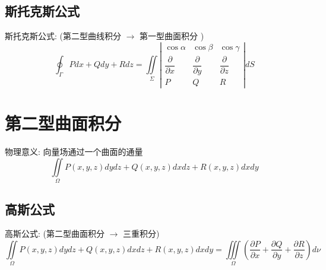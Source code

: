\subsection{斯托克斯公式}
\begin{theorem}[斯托克斯公式]
	斯托克斯公式: (第二型曲线积分 $\rightarrow$ 第一型曲面积分 )
	$$\oint_{\Gamma}Pdx+Qdy+Rdz=\iint\limits_{\Sigma}\left| \begin{array}{lll}
		\cos\alpha&\cos\beta&\cos\gamma\\
		\dfrac{\partial}{\partial x}&\dfrac{\partial }{\partial y}&\dfrac{\partial}{\partial z}\\
		P&Q&R
	\end{array}\right|dS $$
\end{theorem}
\section{第二型曲面积分}
\begin{definition}[第二型曲面积分]
	物理意义: 向量场通过一个曲面的通量
	$$\iint\limits_{\Omega}P(x,y,z)dydz+Q(x,y,z)dxdz+R(x,y,z)dxdy$$
\end{definition}
\subsection{高斯公式}
\begin{theorem}[高斯公式]
	高斯公式: (第二型曲面积分 $\rightarrow$ 三重积分)
	$$\iint\limits_{\Omega}P(x,y,z)dydz+Q(x,y,z)dxdz+R(x,y,z)dxdy=\iiint\limits_{\Omega}(\frac{\partial P}{\partial x}+\frac{\partial Q}{\partial y}+\frac{\partial R}{\partial z})d\nu$$
\end{theorem}